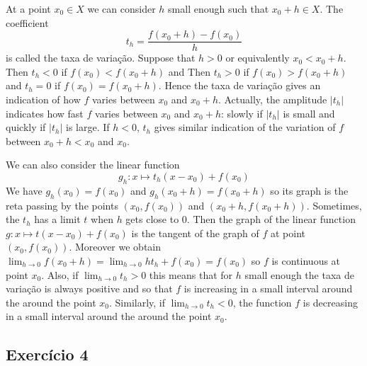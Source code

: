 At a point $x_0 \in X$ we can consider $h$ small enough such that $x_0+h \in X$.
The coefficient $$t_h=\frac{f(x_0+h) - f(x_0)}{h}$$
is called the taxa de variação. Suppose that $h > 0$ or equivalently
$x_0 < x_0+h$. Then $t_h < 0$ if $f(x_0) < f(x_0+h)$ and
Then $t_h > 0$ if $f(x_0) > f(x_0+h)$ and $t_h=0$ if $f(x_0) = f(x_0+h)$.
Hence the taxa de variação gives an indication of how $f$ varies between
$x_0$ and $x_0+h$. Actually, the amplitude $|t_h|$ indicates how fast
$f$ varies between $x_0$ and $x_0+h$: slowly if $|t_h|$ is small and
quickly if $|t_h|$ is large. If $h < 0$, $t_h$ gives similar indication of
the variation of $f$ between $x_0+h < x_0$ and $x_0$.

We can also consider the linear function
$$g_h: x \mapsto t_h {(x - x_0)} + f(x_0)$$
We have $g_h(x_0) = f(x_0)$ and $g_h(x_0+h) = f(x_0+h)$ so its graph is the reta
passing by the points $(x_0, f(x_0))$ and $(x_0+h, f(x_0+h))$.
Sometimes, the $t_h$ has a limit $t$ when $h$ gets close to $0$.
Then the graph of the linear function $g: x \mapsto t{(x-x_0)} + f(x_0)$ is
the tangent of the graph of $f$ at point $(x_0,f(x_0))$.
Moreover we obtain
$\lim_{h \rightarrow 0} f(x_0+h) = \lim_{h \rightarrow 0} h t_h + f(x_0) = f(x_0)$
so $f$ is continuous at point $x_0$.
Also, if $\lim_{h \rightarrow 0} t_h > 0$ this means that for $h$ small enough
the taxa de variação is always positive and so that $f$ is increasing in a small
interval around the around the point $x_0$. Similarly, if
$\lim_{h \rightarrow 0} t_h < 0$, the function $f$ is decreasing in a small
interval around the around the point $x_0$.

\subsection*{Exercício 4}

